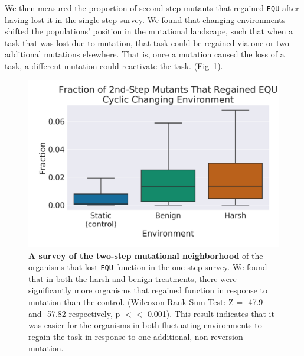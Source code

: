 \documentclass[10pt,letterpaper,final]{article}
\begin{document}
We then measured the proportion of second step mutants that regained \texttt{EQU} after having lost it in the single-step survey. We found that 
changing environments shifted the populations' position in the mutational landscape, such that when a task that was lost due to mutation, that task could be regained via one or two additional mutations elsewhere. That is, once a mutation caused the loss of a task, a different mutation could reactivate the task. (Fig~\ref{fig:CCE_two_step}). 

	\begin{figure}[!h] %
	\includegraphics[width=0.95\columnwidth]{figures/CE/CCE_frac_2step__box.png}
	\caption{\textbf{A survey of the two-step mutational neighborhood} of the organisms that lost \texttt{EQU} function in the one-step survey. We found that in both the harsh and benign treatments, there were significantly more organisms that regained function in response to mutation than the control. (Wilcoxon Rank Sum Test: Z = -47.9 and -57.82 respectively, p $<<$ 0.001). This result indicates that it was easier for the organisms in both fluctuating environments to regain the task in response to one additional, non-reversion mutation.   
	}\label{fig:CCE_two_step}
	\end{figure}
\end{document}
